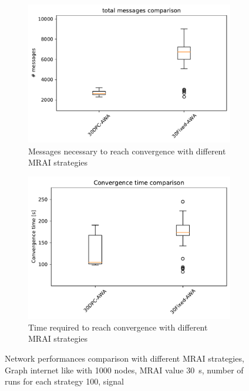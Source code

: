 \begin{figure}[h]
     \centering
     \begin{subfigure}[b]{0.49\textwidth}
         \centering
         \includegraphics[width=\textwidth]{images/internet_like/1000/comparison/comparison_AWA_messages_boxplot.pdf}
		 \caption{Messages necessary to reach convergence with different
			 \ac{MRAI} strategies}
         \label{fig:boxplot_internet_like_1000_messages_AWA}
     \end{subfigure}
     \hfill
     \begin{subfigure}[b]{0.49\textwidth}
         \centering
         \includegraphics[width=\textwidth]{images/internet_like/1000/comparison/comparison_AWA_time_boxplot.pdf}
		 \caption{Time required to reach convergence with different \ac{MRAI}
			 strategies}
         \label{fig:boxplot_internet_like_1000_time_AWA}
     \end{subfigure}
	 \caption{Network performances comparison with different \ac{MRAI} strategies,
		Graph internet like with \num{1000} nodes, \ac{MRAI} value
		\SI{30}{\second}, number of runs for each strategy \num{100}, signal }
        \label{fig:boxplot_internet_like_1000_AWA}
\end{figure}

